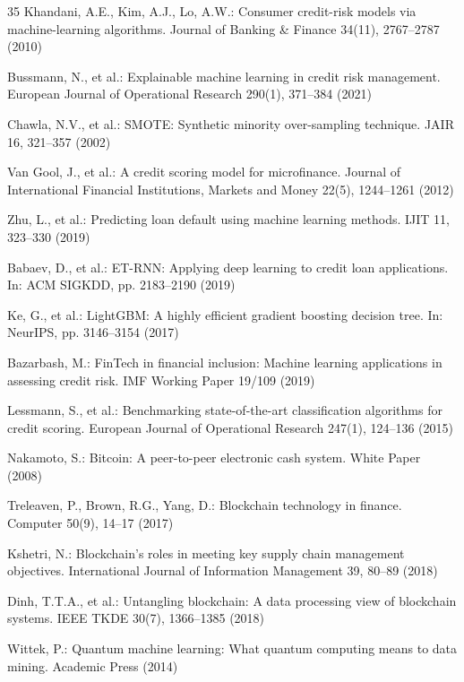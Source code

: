 \documentclass[runningheads]{llncs}
\begin{document}
\begin{thebibliography}{35}
Khandani, A.E., Kim, A.J., Lo, A.W.: Consumer credit-risk models via machine-learning algorithms. Journal of Banking \& Finance 34(11), 2767--2787 (2010)

Bussmann, N., et al.: Explainable machine learning in credit risk management. European Journal of Operational Research 290(1), 371--384 (2021)

Chawla, N.V., et al.: SMOTE: Synthetic minority over-sampling technique. JAIR 16, 321--357 (2002)

Van Gool, J., et al.: A credit scoring model for microfinance. Journal of International Financial Institutions, Markets and Money 22(5), 1244--1261 (2012)

Zhu, L., et al.: Predicting loan default using machine learning methods. IJIT 11, 323--330 (2019)

Babaev, D., et al.: ET-RNN: Applying deep learning to credit loan applications. In: ACM SIGKDD, pp. 2183--2190 (2019)

Ke, G., et al.: LightGBM: A highly efficient gradient boosting decision tree. In: NeurIPS, pp. 3146--3154 (2017)

Bazarbash, M.: FinTech in financial inclusion: Machine learning applications in assessing credit risk. IMF Working Paper 19/109 (2019)

Lessmann, S., et al.: Benchmarking state-of-the-art classification algorithms for credit scoring. European Journal of Operational Research 247(1), 124--136 (2015)

Nakamoto, S.: Bitcoin: A peer-to-peer electronic cash system. White Paper (2008)

Treleaven, P., Brown, R.G., Yang, D.: Blockchain technology in finance. Computer 50(9), 14--17 (2017)

Kshetri, N.: Blockchain's roles in meeting key supply chain management objectives. International Journal of Information Management 39, 80--89 (2018)

Dinh, T.T.A., et al.: Untangling blockchain: A data processing view of blockchain systems. IEEE TKDE 30(7), 1366--1385 (2018)

Wittek, P.: Quantum machine learning: What quantum computing means to data mining. Academic Press (2014)


\end{thebibliography}
\end{document}
